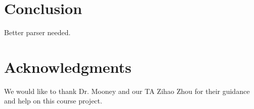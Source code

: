 \section{Conclusion}
\label{sec:length}
Better parser needed. 

\section*{Acknowledgments}
We would like to thank Dr. Mooney and our TA Zihao Zhou for their guidance and help on this course project. 
